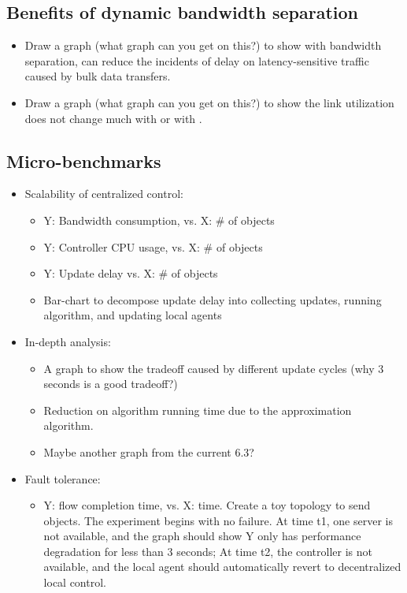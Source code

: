 \subsection{Benefits of dynamic bandwidth separation}
\label{subsec:evaluation:separation}

\begin{itemize}
\item Draw a graph (what graph can you get on this?) to show with bandwidth separation, \name can reduce the incidents of delay on latency-sensitive traffic caused by bulk data transfers.
\item Draw a graph (what graph can you get on this?) to show the link utilization does not change much with \name or with \company.
\end{itemize}

\subsection{Micro-benchmarks}
\label{subsec:evaluation:benchmarks}

\begin{itemize}
\item Scalability of centralized control:
\begin{itemize}
\item Y: Bandwidth consumption, vs. X: \# of objects
\item Y: Controller CPU usage, vs. X: \# of objects
\item Y: Update delay vs. X: \# of objects
\item Bar-chart to decompose update delay into collecting updates, running algorithm, and updating local agents
\end{itemize}

\item In-depth analysis:
\begin{itemize}
\item A graph to show the tradeoff caused by different update cycles (why 3 seconds is a good tradeoff?)
\item Reduction on algorithm running time due to the approximation algorithm.
\item Maybe another graph from the current 6.3?
\end{itemize}

\item Fault tolerance:
\begin{itemize}
\item Y: flow completion time, vs. X: time. Create a toy topology to send objects. The experiment begins with no failure. At time t1, one server is not available, and the graph should show Y only has performance degradation for less than 3 seconds; At time t2, the controller is not available, and the local agent should automatically revert to decentralized local control.
\end{itemize}

\end{itemize}




